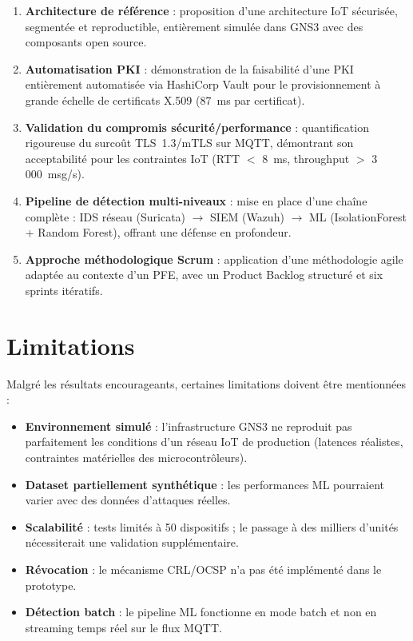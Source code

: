 \begin{enumerate}
  \item \textbf{Architecture de référence} : proposition d'une architecture IoT sécurisée, segmentée et reproductible, entièrement simulée dans GNS3 avec des composants open source.
  \item \textbf{Automatisation PKI} : démonstration de la faisabilité d'une PKI entièrement automatisée via HashiCorp Vault pour le provisionnement à grande échelle de certificats X.509 (87~ms par certificat).
  \item \textbf{Validation du compromis sécurité/performance} : quantification rigoureuse du surcoût TLS~1.3/mTLS sur MQTT, démontrant son acceptabilité pour les contraintes IoT (RTT $<$ 8~ms, throughput $>$ 3\,000~msg/s).
  \item \textbf{Pipeline de détection multi-niveaux} : mise en place d'une chaîne complète : IDS réseau (Suricata) $\to$ SIEM (Wazuh) $\to$ ML (IsolationForest + Random Forest), offrant une défense en profondeur.
  \item \textbf{Approche méthodologique Scrum} : application d'une méthodologie agile adaptée au contexte d'un PFE, avec un Product Backlog structuré et six sprints itératifs.
\end{enumerate}

\section*{Limitations}

Malgré les résultats encourageants, certaines limitations doivent être mentionnées :

\begin{itemize}
  \item \textbf{Environnement simulé} : l'infrastructure GNS3 ne reproduit pas parfaitement les conditions d'un réseau IoT de production (latences réalistes, contraintes matérielles des microcontrôleurs).
  \item \textbf{Dataset partiellement synthétique} : les performances ML pourraient varier avec des données d'attaques réelles.
  \item \textbf{Scalabilité} : tests limités à 50 dispositifs ; le passage à des milliers d'unités nécessiterait une validation supplémentaire.
  \item \textbf{Révocation} : le mécanisme CRL/OCSP n'a pas été implémenté dans le prototype.
  \item \textbf{Détection batch} : le pipeline ML fonctionne en mode batch et non en streaming temps réel sur le flux MQTT.
\end{itemize}

